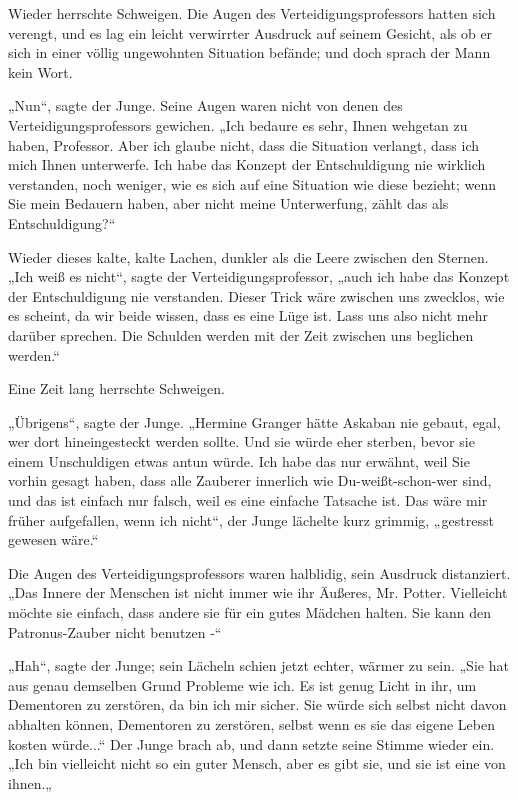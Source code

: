 {Wieder herrschte Schweigen. Die Augen des Verteidigungsprofessors hatten sich verengt, und es lag ein leicht verwirrter Ausdruck auf seinem Gesicht, als ob er sich in einer völlig ungewohnten Situation befände; und doch sprach der Mann kein Wort.

„Nun“, sagte der Junge. Seine Augen waren nicht von denen des Verteidigungsprofessors gewichen. „Ich bedaure es sehr, Ihnen wehgetan zu haben, Professor. Aber ich glaube nicht, dass die Situation verlangt, dass ich mich Ihnen unterwerfe. Ich habe das Konzept der Entschuldigung nie wirklich verstanden, noch weniger, wie es sich auf eine Situation wie diese bezieht; wenn Sie mein Bedauern haben, aber nicht meine Unterwerfung, zählt das als Entschuldigung?“

Wieder dieses kalte, kalte Lachen, dunkler als die Leere zwischen den Sternen. „Ich weiß es nicht“, sagte der Verteidigungsprofessor, „auch ich habe das Konzept der Entschuldigung nie verstanden. Dieser Trick wäre zwischen uns zwecklos, wie es scheint, da wir beide wissen, dass es eine Lüge ist. Lass uns also nicht mehr darüber sprechen. Die Schulden werden mit der Zeit zwischen uns beglichen werden.“

Eine Zeit lang herrschte Schweigen.

„Übrigens“, sagte der Junge. „Hermine Granger hätte Askaban nie gebaut, egal, wer dort hineingesteckt werden sollte. Und sie würde eher sterben, bevor sie einem Unschuldigen etwas antun würde. Ich habe das nur erwähnt, weil Sie vorhin gesagt haben, dass alle Zauberer innerlich wie Du-weißt-schon-wer sind, und das ist einfach nur falsch, weil es eine einfache Tatsache ist. Das wäre mir früher aufgefallen, wenn ich nicht“, der Junge lächelte kurz grimmig, „gestresst gewesen wäre.“

Die Augen des Verteidigungsprofessors waren halblidig, sein Ausdruck distanziert. „Das Innere der Menschen ist nicht immer wie ihr Äußeres, Mr. Potter. Vielleicht möchte sie einfach, dass andere sie für ein gutes Mädchen halten. Sie kann den Patronus-Zauber nicht benutzen -“

„Hah“, sagte der Junge; sein Lächeln schien jetzt echter, wärmer zu sein. „Sie hat aus genau demselben Grund Probleme wie ich. Es ist genug Licht in ihr, um Dementoren zu zerstören, da bin ich mir sicher. Sie würde sich selbst nicht davon abhalten können, Dementoren zu zerstören, selbst wenn es sie das eigene Leben kosten würde...“ Der Junge brach ab, und dann setzte seine Stimme wieder ein. „Ich bin vielleicht nicht so ein guter Mensch, aber es gibt sie, und sie ist eine von ihnen.„

}
